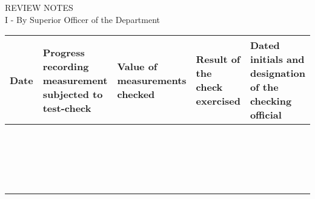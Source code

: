 \documentclass[a4paper,10pt]{article}
\begin{document}
\begin{titlepage}
    \vspace*{\fill}
    \bf
	\begin{center}
	    REVIEW NOTES \\
	    I - By Superior Officer of the Department \\
	\end{center}
	
	\begin{longtabu} to \textwidth {|X[5,l]|X[10,l]|X[10,l]|X[10,l]|X[10,l]|}
	    \hline
	    Date & Progress recording measurement subjected to test-check & Value of measurements checked & Result of the check exercised & Dated initials and designation of the checking official \\
	    \hline \hline
	    & & & & \\[0.2cm] \hline
	    & & & & \\[0.2cm] \hline
	    & & & & \\[0.2cm] \hline
	    & & & & \\[0.2cm] \hline
	    & & & & \\[0.2cm] \hline
	    & & & & \\[0.2cm] \hline
	    & & & & \\[0.2cm] \hline
	    & & & & \\[0.2cm] \hline
	    & & & & \\[0.2cm] \hline
	    & & & & \\[0.2cm] \hline
	    & & & & \\[0.2cm] \hline
	    & & & & \\[0.2cm] \hline
	    & & & & \\[0.2cm] \hline
	    & & & & \\[0.2cm] \hline
	    & & & & \\[0.2cm] \hline
	    & & & & \\[0.2cm] \hline
	    & & & & \\[0.2cm] \hline
	    & & & & \\[0.2cm] \hline
	    & & & & \\[0.2cm] \hline
	\end{longtabu}
	
    \vspace*{\fill}
\end{titlepage}

\newpage
\end{document}

